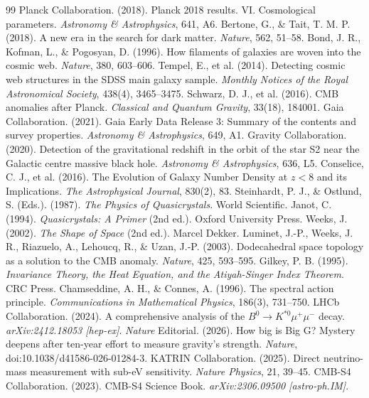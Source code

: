 \documentclass[12pt,a4paper,oneside]{article}
\theoremstyle{plain}
\theoremstyle{definition}
\theoremstyle{remark}
\begin{document}
\begin{thebibliography}{99}
     Planck Collaboration. (2018). Planck 2018 results. VI. Cosmological parameters. \textit{Astronomy \& Astrophysics}, 641, A6.
     Bertone, G., \& Tait, T. M. P. (2018). A new era in the search for dark matter. \textit{Nature}, 562, 51--58.
     Bond, J. R., Kofman, L., \& Pogosyan, D. (1996). How filaments of galaxies are woven into the cosmic web. \textit{Nature}, 380, 603--606.
     Tempel, E., et al. (2014). Detecting cosmic web structures in the SDSS main galaxy sample. \textit{Monthly Notices of the Royal Astronomical Society}, 438(4), 3465--3475.
     Schwarz, D. J., et al. (2016). CMB anomalies after Planck. \textit{Classical and Quantum Gravity}, 33(18), 184001.
     Gaia Collaboration. (2021). Gaia Early Data Release 3: Summary of the contents and survey properties. \textit{Astronomy \& Astrophysics}, 649, A1.
     Gravity Collaboration. (2020). Detection of the gravitational redshift in the orbit of the star S2 near the Galactic centre massive black hole. \textit{Astronomy \& Astrophysics}, 636, L5.
     Conselice, C. J., et al. (2016). The Evolution of Galaxy Number Density at $z < 8$ and its Implications. \textit{The Astrophysical Journal}, 830(2), 83.
     Steinhardt, P. J., \& Ostlund, S. (Eds.). (1987). \textit{The Physics of Quasicrystals}. World Scientific.
     Janot, C. (1994). \textit{Quasicrystals: A Primer} (2nd ed.). Oxford University Press.
     Weeks, J. (2002). \textit{The Shape of Space} (2nd ed.). Marcel Dekker.
     Luminet, J.-P., Weeks, J. R., Riazuelo, A., Lehoucq, R., \& Uzan, J.-P. (2003). Dodecahedral space topology as a solution to the CMB anomaly. \textit{Nature}, 425, 593--595.
     Gilkey, P. B. (1995). \textit{Invariance Theory, the Heat Equation, and the Atiyah-Singer Index Theorem}. CRC Press.
     Chamseddine, A. H., \& Connes, A. (1996). The spectral action principle. \textit{Communications in Mathematical Physics}, 186(3), 731--750.
     LHCb Collaboration. (2024). A comprehensive analysis of the $B^0 \to K^{*0}\mu^+\mu^-$ decay. \textit{arXiv:2412.18053 [hep-ex]}.
     \textit{Nature} Editorial. (2026). How big is Big G? Mystery deepens after ten-year effort to measure gravity's strength. \textit{Nature}, doi:10.1038/d41586-026-01284-3.
     KATRIN Collaboration. (2025). Direct neutrino-mass measurement with sub-eV sensitivity. \textit{Nature Physics}, 21, 39--45.
     CMB-S4 Collaboration. (2023). CMB-S4 Science Book. \textit{arXiv:2306.09500 [astro-ph.IM]}.
\end{thebibliography}
\end{document}
